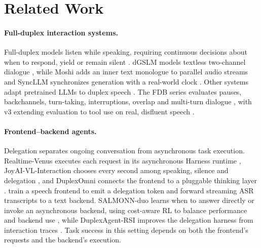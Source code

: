 \section{Related Work}
\label{sec:related}

\paragraph{Full-duplex interaction systems.}
Full-duplex models listen while speaking, requiring continuous decisions about when to respond, yield or remain silent \citep{skantze2021turntaking}.
dGSLM models textless two-channel dialogue \citep{nguyen-etal-2023-generative}, while Moshi adds an inner text monologue to parallel audio streams \citep{defossez2024moshi} and SyncLLM synchronizes generation with a real-world clock \citep{veluri-etal-2024-beyond}.
Other systems adapt pretrained LLMs to duplex speech \citep{wang2024freezeomni,hu2025salmduplex,yu2025salmonnomni,yao2025flmaudio,chen2025funaudiochat,fang2026baylingduplex,cui2026minicpmo45}.
The FDB series evaluates pauses, backchannels, turn-taking, interruptions, overlap and multi-turn dialogue \citep{lin2025fullduplexbench,lin2025fdbv15,lin2026fdbv2}, with v3 extending evaluation to tool use on real, disfluent speech \citep{lin2026fdbv3}.

\paragraph{Frontend--backend agents.}
Delegation separates ongoing conversation from asynchronous task execution.
Realtime-Venus executes each  request in its asynchronous Harness runtime \citep{venus2026realtimevenus}, JoyAI-VL-Interaction chooses every second among speaking, silence and delegation \citep{joyai2026vlinteraction}, and DuplexOmni connects the frontend to a pluggable thinking layer \citep{huang2026duplexomni}.
\citet{hu2026frontendbackend} train a speech frontend to emit a delegation token and forward streaming ASR transcripts to a text backend.
SALMONN-duo learns when to answer directly or invoke an asynchronous backend, using cost-aware RL to balance performance and backend use \citep{yu2026salmonnduo}, while DuplexAgent-RSI improves the delegation harness from interaction traces \citep{shen2026duplexagentrsi}.
Task success in this setting depends on both the frontend's requests and the backend's execution.

